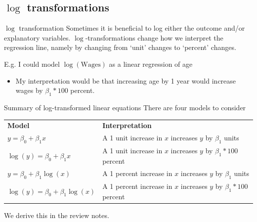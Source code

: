 \documentclass[aspectratio=169,t,11pt,table]{beamer}
\begin{document}
\subsection*{\texorpdfstring{$\log$}{log} transformations}

\begin{frame}{$\log$ transformation}
	Sometimes it is beneficial to log either the outcome and/or explanatory variables. $\log$-transformations change how we interpret the regression line, namely by changing from `unit' changes to `percent' changes.
	
	\pause
	\bigskip
	E.g. I could model $\log(\text{Wages})$ as a linear regression of age
	\begin{itemize}
		\item My interpretation would be that increasing age by 1 year would increase wages by $\beta_1 * 100$ percent.
	\end{itemize}
\end{frame}

\begin{frame}{Summary of log-transformed linear equations}
	There are four models to consider

	\bigskip
	\begin{tabular}{@{}
		p{} p{}
	@{}}
		\toprule
		\textbf{Model} & \textbf{Interpretation} \\

		\addlinespace[1mm]
		\midrule
		\addlinespace[1mm]

		$y = \beta_0 + \beta_1 x$ & 
		{\small A 1 unit increase in $x$ increases $y$ by $\beta_1$ units} \\

		$\log(y) = \beta_0 + \beta_1 x$ & 
		{\small A 1 unit increase in $x$ increases $y$ by $\beta_1 * 100$ percent} \\

		$y = \beta_0 + \beta_1 \log(x)$ & 
		{\small A 1 percent increase in $x$ increases $y$ by $\beta_1$ units} \\

		$\log(y) = \beta_0 + \beta_1 \log(x)$ & 
		{\small A 1 percent increase in $x$ increases $y$ by $\beta_1 * 100$ percent} \\

		\bottomrule
	\end{tabular}

	\bigskip
	We derive this in the review notes.
\end{frame}
\end{document}
